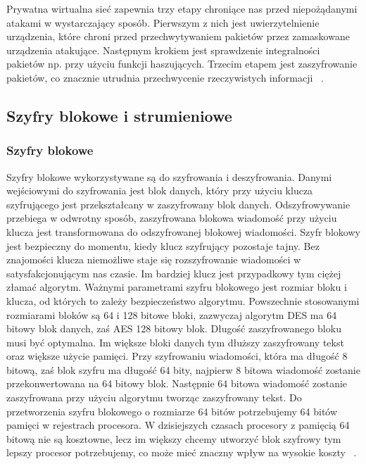\documentclass[12p]{article}
\begin{document}
\begin{description}
\quad Prywatna wirtualna sieć zapewnia trzy etapy chroniące nas przed niepożądanymi atakami w wystarczający sposób. Pierwszym z nich jest uwierzytelnienie urządzenia, które chroni przed przechwytywaniem pakietów przez zamaskowane urządzenia atakujące. Następnym krokiem jest sprawdzenie integralności pakietów np. przy użyciu funkcji haszujących. Trzecim etapem jest zaszyfrowanie pakietów, co znacznie utrudnia przechwycenie rzeczywistych informacji ~\cite{man_in_the_middle}.
\end{description}



\subsection{Szyfry blokowe i strumieniowe}
\subsubsection{Szyfry blokowe} 
\quad Szyfry blokowe wykorzystywane są do szyfrowania i deszyfrowania. Danymi wejściowymi do szyfrowania jest blok danych, który przy użyciu klucza szyfrującego jest przekształcany w zaszyfrowany blok danych. Odszyfrowywanie przebiega w odwrotny sposób, zaszyfrowana blokowa wiadomość przy użyciu klucza jest transformowana do odszyfrowanej blokowej wiadomości. Szyfr blokowy jest bezpieczny do momentu, kiedy klucz szyfrujący pozostaje tajny. Bez znajomości klucza niemożliwe staje się rozszyfrowanie wiadomości w satysfakcjonującym nas czasie. Im bardziej klucz jest przypadkowy tym ciężej złamać algorytm. Ważnymi parametrami szyfru blokowego jest rozmiar bloku i klucza, od których to zależy bezpieczeństwo algorytmu. Powszechnie stosowanymi rozmiarami bloków są 64 i 128 bitowe bloki, zazwyczaj algorytm DES ma 64 bitowy blok danych, zaś AES 128 bitowy blok. Długość zaszyfrowanego bloku musi być optymalna. Im większe bloki danych tym dłuższy zaszyfrowany tekst oraz większe użycie pamięci. Przy szyfrowaniu wiadomości, która ma długość 8 bitową, zaś blok szyfru ma długość 64 bity, najpierw 8 bitowa wiadomość zostanie przekonwertowana na 64 bitowy blok. Następnie 64 bitowa wiadomość zostanie zaszyfrowana przy użyciu algorytmu tworząc zaszyfrowany tekst. Do przetworzenia szyfru blokowego o rozmiarze 64 bitów potrzebujemy 64 bitów pamięci w rejestrach procesora. W dzisiejszych czasach procesory z pamięcią 64 bitową nie są kosztowne, lecz im większy chcemy utworzyć blok szyfrowy tym lepszy procesor potrzebujemy, co może mieć znaczny wpływ na wysokie koszty ~\cite{blok_cipher}.
\end{document}
